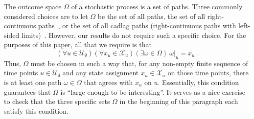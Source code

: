 \documentclass[10pt,a4paper]{paper}
\theoremstyle{definition}
\newcommand{\states}{\mathcal{X}}
\begin{document}
The outcome space $\Omega$ of a stochastic process is a set of paths. Three commonly considered choices are to let $\Omega$ be the set of all paths, the set of all right-continuous paths~\cite{norris1998markov}, or the set of all cadlag paths (right-continuous paths with left-sided limits)~\cite{williams2000}. However, our results do not require such a specific choice. For the purposes of this paper, all that we require is that
\begin{equation}\label{eq:path_exists_for_finite_points}
(\forall u\in\mathcal{U}_\emptyset)(\forall x_u\in\states_u)(\exists \omega\in\Omega)~\omega\vert_u=x_u\,.
\end{equation}
Thus, $\Omega$ must be chosen in such a way that, for any non-empty finite sequence of time points $u\in\mathcal{U}_\emptyset$ and any state assignment $x_u\in\states_u$ on those time points, there is at least one path $\omega\in\Omega$ that agrees with $x_u$ on $u$. Essentially, 
this condition
guarantees that $\Omega$ is ``large enough to be interesting''. It serves as a nice exercise to check that the three specific sets $\Omega$ in the beginning of this paragraph each satisfy this condition.
\end{document}
